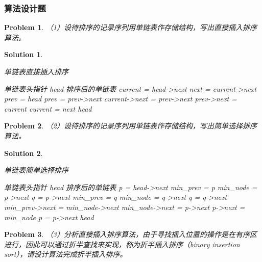 \documentclass[12pt,a4paper]{amsart}
\newtheorem{problem}{Problem}[section]
\newtheorem{solution}{Solution}[section]
\begin{document}
\subsubsection{算法设计题}

\begin{problem}
（1）设待排序的记录序列用单链表作存储结构，写出直接插入排序算法。
\end{problem}

\begin{solution}
\begin{algorithm}
\caption{单链表直接插入排序}
\begin{algorithmic}[1]
\REQUIRE 单链表头指针 head
\ENSURE 排序后的单链表
\STATE current = head->next
\STATE next = current->next
\STATE prev = head
\STATE prev = prev->next
\ENDWHILE
\STATE current->next = prev->next
\STATE prev->next = current
\STATE current = next
\ENDWHILE
\RETURN head
\end{algorithmic}
\end{algorithm}
\end{solution}

\begin{problem}
（2）设待排序的记录序列用单链表作存储结构，写出简单选择排序算法。
\end{problem}

\begin{solution}
\begin{algorithm}
\caption{单链表简单选择排序}
\begin{algorithmic}[1]
\REQUIRE 单链表头指针 head
\ENSURE 排序后的单链表
\STATE p = head->next
\STATE min\_prev = p
\STATE min\_node = p->next
\STATE q = p->next
\STATE min\_prev = q
\STATE min\_node = q->next
\ENDIF
\STATE q = q->next
\ENDWHILE
{}
\STATE min\_prev->next = min\_node->next
\STATE min\_node->next = p->next
\STATE p->next = min\_node
\ENDIF
\STATE p = p->next
\ENDWHILE
\RETURN head
\end{algorithmic}
\end{algorithm}
\end{solution}

\begin{problem}
（3）分析直接插入排序算法，由于寻找插入位置的操作是在有序区进行，因此可以通过折半查找来实现，称为折半插入排序（binary insertion sort），请设计算法完成折半插入排序。
\end{problem}
\end{document}
